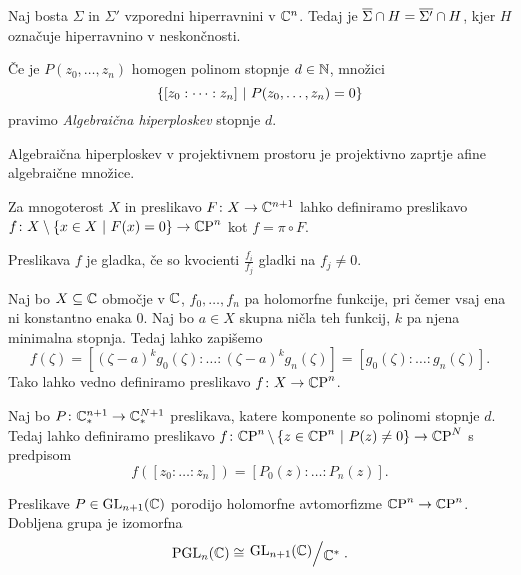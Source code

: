 \begin{trditev}
Naj bosta $\Sigma$ in $\Sigma'$ vzporedni hiperravnini v $\mathbb{C}^n$.
Tedaj je $\overline{\Sigma} \cap H = \overline{\Sigma'} \cap H$, kjer $H$
označuje hiperravnino v neskončnosti.
\end{trditev}

\obvs

\begin{definicija}
Če je $P(z_0, \dots, z_n)$ homogen polinom stopnje $d \in \mathbb{N}$,
množici
\[
\left\{[z_0 : \cdots : z_n]~\middle\vert~P(z_0, \dots, z_n) = 0\right\}
\]
pravimo
\emph{Algebraična hiperploskev}
stopnje $d$.
\end{definicija}

\begin{opomba}
Algebraična hiperploskev v projektivnem prostoru je projektivno
zaprtje afine algebraične množice.
\end{opomba}

\begin{definicija}
Za mnogoterost $X$ in preslikavo $F \colon X \to \mathbb{C}^{n+1}$ lahko
definiramo preslikavo
$f \colon X \setminus \left\{x \in X~\middle\vert~F(x) = 0\right\} \to \mathbb{C}\!\operatorname{P}^{n}$
kot $f = \pi \circ F$.
\end{definicija}

\begin{opomba}
Preslikava $f$ je gladka, če so kvocienti $\frac{f_i}{f_j}$ gladki
na $f_j \ne 0$.
\end{opomba}

\begin{primer}
Naj bo $X \subseteq \mathbb{C}$ območje v $\mathbb{C}$, $f_0, \dots, f_n$ pa
holomorfne funkcije, pri čemer vsaj ena ni konstantno enaka $0$.
Naj bo $a \in X$ skupna ničla teh funkcij, $k$ pa njena minimalna
stopnja. Tedaj lahko zapišemo
\[
f(\zeta) =
[(\zeta-a)^k g_0(\zeta) : \dots : (\zeta-a)^k g_n(\zeta)] =
[g_0(\zeta) : \dots : g_n(\zeta)].
\]
Tako lahko vedno definiramo preslikavo
$f \colon X \to \mathbb{C}\!\operatorname{P}^{n}$.
\end{primer}

\begin{definicija}
Naj bo $P \colon \mathbb{C}_*^{n+1} \to \mathbb{C}_*^{N+1}$ preslikava, katere
komponente so polinomi stopnje $d$. Tedaj lahko definiramo
preslikavo
$f \colon \mathbb{C}\!\operatorname{P}^{n} \setminus
\left\{z \in \mathbb{C}\!\operatorname{P}^{n}~\middle\vert~P(z) \ne 0\right\} \to \mathbb{C}\!\operatorname{P}^{N}$
s predpisom
\[
f([z_0 : \dots : z_n]) = [P_0(z) : \dots : P_n(z)].
\]
\end{definicija}

\begin{primer}
Preslikave $P \in \operatorname{GL}_{n+1}(\mathbb{C})$ porodijo holomorfne avtomorfizme
$\mathbb{C}\!\operatorname{P}^{n} \to \mathbb{C}\!\operatorname{P}^{n}$. Dobljena grupa je izomorfna
\[
\operatorname{PGL}_{n}(\C) \cong \kvoc{\GL_{n+1}(\C)}{\C^*}.
\]
\end{primer}

